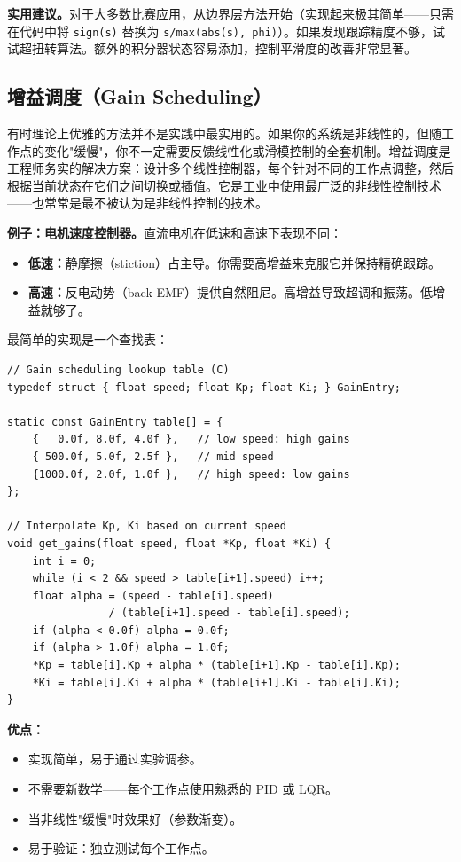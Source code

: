 \textbf{实用建议。}对于大多数比赛应用，从边界层方法开始（实现起来极其简单——只需在代码中将 \texttt{sign(s)} 替换为 \texttt{s/max(abs(s), phi)}）。如果发现跟踪精度不够，试试超扭转算法。额外的积分器状态容易添加，控制平滑度的改善非常显著。

\subsection{增益调度（Gain Scheduling）}

有时理论上优雅的方法并不是实践中最实用的。如果你的系统是非线性的，但随工作点的变化"缓慢"，你不一定需要反馈线性化或滑模控制的全套机制。增益调度是工程师务实的解决方案：设计多个线性控制器，每个针对不同的工作点调整，然后根据当前状态在它们之间切换或插值。它是工业中使用最广泛的非线性控制技术——也常常是最不被认为是非线性控制的技术。

\textbf{例子：电机速度控制器。}直流电机在低速和高速下表现不同：
\begin{itemize}[nosep]
    \item \textbf{低速：}静摩擦（stiction）占主导。你需要高增益来克服它并保持精确跟踪。
    \item \textbf{高速：}反电动势（back-EMF）提供自然阻尼。高增益导致超调和振荡。低增益就够了。
\end{itemize}

最简单的实现是一个查找表：

\begin{verbatim}
// Gain scheduling lookup table (C)
typedef struct { float speed; float Kp; float Ki; } GainEntry;

static const GainEntry table[] = {
    {   0.0f, 8.0f, 4.0f },   // low speed: high gains
    { 500.0f, 5.0f, 2.5f },   // mid speed
    {1000.0f, 2.0f, 1.0f },   // high speed: low gains
};

// Interpolate Kp, Ki based on current speed
void get_gains(float speed, float *Kp, float *Ki) {
    int i = 0;
    while (i < 2 && speed > table[i+1].speed) i++;
    float alpha = (speed - table[i].speed)
                / (table[i+1].speed - table[i].speed);
    if (alpha < 0.0f) alpha = 0.0f;
    if (alpha > 1.0f) alpha = 1.0f;
    *Kp = table[i].Kp + alpha * (table[i+1].Kp - table[i].Kp);
    *Ki = table[i].Ki + alpha * (table[i+1].Ki - table[i].Ki);
}
\end{verbatim}

\textbf{优点：}
\begin{itemize}[nosep]
    \item 实现简单，易于通过实验调参。
    \item 不需要新数学——每个工作点使用熟悉的 PID 或 LQR。
    \item 当非线性"缓慢"时效果好（参数渐变）。
    \item 易于验证：独立测试每个工作点。
\end{itemize}

